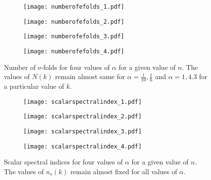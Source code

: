 \documentclass[a4paper,11pt]{article}
\begin{document}
 \begin{figure}[H]
\begin{subfigure}{0.52\linewidth}
  \centering
   \texttt{[image: numberofefolds\_1.pdf]} 
   \subcaption{}
   \label{fig:numberOfEFolds_1}
\end{subfigure}%
\begin{subfigure}{0.52\linewidth}
  \centering
   \texttt{[image: numberofefolds\_2.pdf]}
   \subcaption{}
   \label{fig:numberOfEFolds_2}
\end{subfigure}%
\vspace{0.1\linewidth}
\begin{subfigure}{0.52\linewidth}
  \centering
   \texttt{[image: numberofefolds\_3.pdf]}
   \subcaption{}
    \label{fig:numberOfEFolds_3}
\end{subfigure}%
\begin{subfigure}{0.52\linewidth}
  \centering
   \texttt{[image: numberofefolds\_4.pdf]}
   \subcaption{}
    \label{fig:numberOfEFolds_4}
\end{subfigure}
\caption{Number of e-folds for four values of $\alpha$ for a given value of $n$. The values of $N(k)$ remain almost same for $\alpha=\frac{1}{10},\frac{1}{6}$ and $\alpha=1,4.3$ for a particular value of $k$.}
\label{fig:numberOfEFolds}
\end{figure}
\begin{figure}[H]
\begin{subfigure}{0.52\linewidth}
  \centering
   \texttt{[image: scalarspectralindex\_1.pdf]} 
   \subcaption{}
   \label{fig:scalarSpectralIndex_1}
\end{subfigure}%
\begin{subfigure}{0.52\linewidth}
  \centering
   \texttt{[image: scalarspectralindex\_2.pdf]}
   \subcaption{}
   \label{fig:scalarSpectralIndex_2}
\end{subfigure}%
\vspace{0.1\linewidth}
\begin{subfigure}{0.52\linewidth}
  \centering
   \texttt{[image: scalarspectralindex\_3.pdf]}
   \subcaption{}
    \label{fig:scalarSpectralIndex_3}
\end{subfigure}%
\begin{subfigure}{0.52\linewidth}
  \centering
   \texttt{[image: scalarspectralindex\_4.pdf]}
   \subcaption{}
    \label{fig:scalarSpectralIndex_4}
\end{subfigure}
\caption{Scalar spectral indices for four values of $\alpha$ for a given value of $n$. The values of $n_s(k)$ remain almost fixed for all values of $\alpha$.}
\label{fig:scalarSpectralIndex}
\end{figure}
\end{document}
